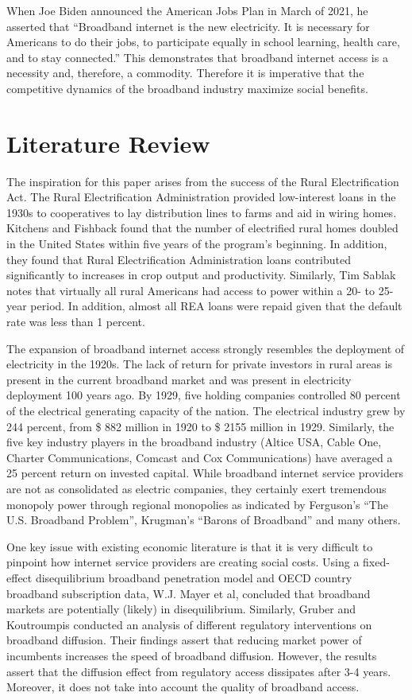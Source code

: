 \documentclass[a4paper,oneside]{article}
\begin{document}
	When Joe Biden announced the American Jobs Plan in March of 2021, he asserted that “Broadband internet is the new electricity. 
	It is necessary for Americans to do their jobs, to participate equally in school learning, health care, and to stay connected.” 
	This demonstrates that broadband internet access is a necessity and, therefore, a commodity. 
	Therefore it is imperative that the competitive dynamics of the broadband industry maximize social benefits.

\section{Literature Review}

\:\:\:\:\:\:The inspiration for this paper arises from the success of the Rural Electrification Act. 
The Rural Electrification Administration provided low-interest loans in the 1930s to cooperatives to lay distribution lines to farms and aid in wiring homes. 
Kitchens and Fishback found that the number of electrified rural homes doubled in the United States within five years of the program's beginning. 
In addition, they found that Rural Electrification Administration loans contributed significantly to increases in crop output and productivity. 
Similarly, Tim Sablak notes that virtually all rural Americans had access to power within a 20- to 25-year period. 
In addition, almost all REA loans were repaid given that the default rate was less than 1 percent.

The expansion of broadband internet access strongly resembles the deployment of electricity in the 1920s. 
The lack of return for private investors in rural areas is present in the current broadband market and was present in electricity deployment 100 years ago. 
By 1929, five holding companies controlled 80 percent of the electrical generating capacity of the nation. 
The electrical industry grew by 244 percent, from \$ 882 million in 1920 to \$ 2155 million in 1929. 
Similarly, the five key industry players in the broadband industry (Altice USA, Cable One, Charter Communications, Comcast and Cox Communications) have averaged a 25 percent return on invested capital.  
While broadband internet service providers are not as consolidated as electric companies, they certainly exert tremendous monopoly power through regional monopolies as indicated by Ferguson's “The U.S. Broadband Problem”, Krugman's “Barons of Broadband” and many others.

One key issue with existing economic literature is that it is very difficult to pinpoint how internet service providers are creating social costs. 
Using a fixed-effect disequilibrium broadband penetration model and OECD country broadband subscription data, W.J. Mayer et al, concluded that broadband markets are potentially (likely) in disequilibrium. 
Similarly, Gruber and Koutroumpis conducted an analysis of different regulatory interventions on broadband diffusion. 
Their findings assert that reducing market power of incumbents increases the speed of broadband diffusion. 
However, the results assert that the diffusion effect from regulatory access dissipates after 3-4 years. 
Moreover, it does not take into account the quality of broadband access. 
\end{document}
